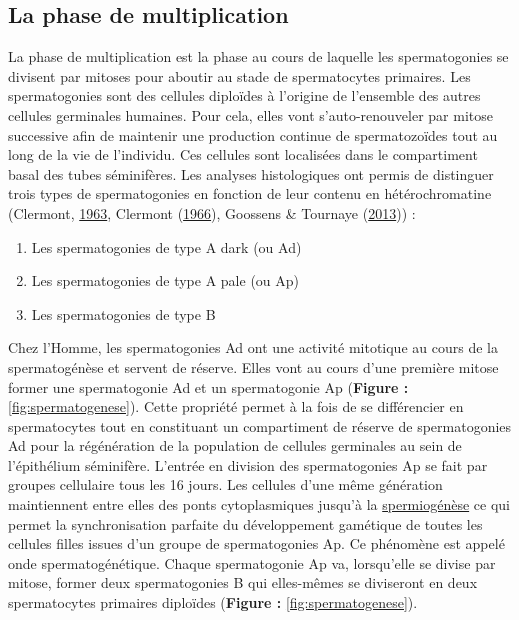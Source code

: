 \documentclass[12pt,twoside]{reedthesis}
\providecommand{\tightlist}{%
  \setlength{\itemsep}{0pt}\setlength{\parskip}{0pt}}
\theoremstyle{definition}
\theoremstyle{definition}
\theoremstyle{remark}
\begin{document}
  \subsection{La phase de
  multiplication}\label{la-phase-de-multiplication}
  
  La phase de multiplication est la phase au cours de laquelle les
  spermatogonies se divisent par mitoses pour aboutir au stade de
  spermatocytes primaires. Les spermatogonies sont des cellules diploïdes
  à l'origine de l'ensemble des autres cellules germinales humaines. Pour
  cela, elles vont s'auto-renouveler par mitose successive afin de
  maintenir une production continue de spermatozoïdes tout au long de la
  vie de l'individu. Ces cellules sont localisées dans le compartiment
  basal des tubes séminifères. Les analyses histologiques ont permis de
  distinguer trois types de spermatogonies en fonction de leur contenu en
  hétérochromatine (Clermont, \protect\hyperlink{ref-Clermont1963}{1963},
  Clermont (\protect\hyperlink{ref-Clermont1966}{1966}), Goossens \&
  Tournaye (\protect\hyperlink{ref-Goossens2013}{2013})) :
  
  \begin{enumerate}
  \def\labelenumi{\arabic{enumi}.}
  \tightlist
  \item
    Les spermatogonies de type A dark (ou Ad)\\
  \item
    Les spermatogonies de type A pale (ou Ap)\\
  \item
    Les spermatogonies de type B
  \end{enumerate}
  
  Chez l'Homme, les spermatogonies Ad ont une activité mitotique au cours
  de la spermatogénèse et servent de réserve. Elles vont au cours d'une
  première mitose former une spermatogonie Ad et un spermatogonie Ap
  (\textbf{Figure :} \ref{fig:spermatogenese}). Cette propriété permet à
  la fois de se différencier en spermatocytes tout en constituant un
  compartiment de réserve de spermatogonies Ad pour la régénération de la
  population de cellules germinales au sein de l'épithélium séminifère.
  L'entrée en division des spermatogonies Ap se fait par groupes
  cellulaire tous les 16 jours. Les cellules d'une même génération
  maintiennent entre elles des ponts cytoplasmiques jusqu'à la
  \protect\hyperlink{spermiogenese}{spermiogénèse} ce qui permet la
  synchronisation parfaite du développement gamétique de toutes les
  cellules filles issues d'un groupe de spermatogonies Ap. Ce phénomène
  est appelé onde spermatogénétique. Chaque spermatogonie Ap va,
  lorsqu'elle se divise par mitose, former deux spermatogonies B qui
  elles-mêmes se diviseront en deux spermatocytes primaires diploïdes
  (\textbf{Figure :} \ref{fig:spermatogenese}).
  
\end{document}
